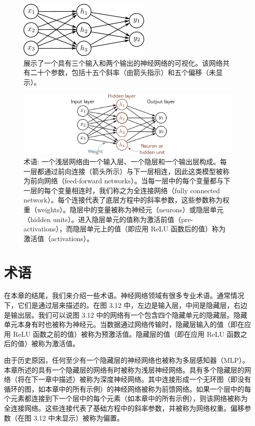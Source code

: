 \begin{figure}[ht!]
	\centering
	\includegraphics[width=0.7\linewidth]{png/chapter3/ShallowNetThreeInputsTwoOutputs.png}
\caption{展示了一个具有三个输入和两个输出的神经网络的可视化。该网络共有二十个参数，包括十五个斜率（由箭头指示）和五个偏移（未显示）。}
\end{figure}

\begin{figure}[ht!]
	\centering
	\includegraphics[width=0.7\linewidth]{png/chapter3/ShallowTerminology.png}
\caption{术语: 一个浅层网络由一个输入层、一个隐层和一个输出层构成。每一层都通过前向连接（箭头所示）与下一层相连，因此这类模型被称为前向网络（feed-forward networks）。当每一层中的每个变量都与下一层的每个变量相连时，我们称之为全连接网络（fully connected network）。每个连接代表了底层方程中的斜率参数，这些参数称为权重（weights）。隐层中的变量被称为神经元（neurons）或隐层单元（hidden units）。进入隐层单元的值称为激活前值（pre-activations），而隐层单元上的值（即应用 ReLU 函数后的值）称为激活值（activations）。}
\end{figure}

\section{术语}
在本章的结尾，我们来介绍一些术语。神经网络领域有很多专业术语。通常情况下，它们是通过层来描述的。在图 3.12 中，左边是输入层，中间是隐藏层，右边是输出层。我们可以说图 3.12 中的网络有一个包含四个隐藏单元的隐藏层。隐藏单元本身有时也被称为神经元。当数据通过网络传输时，隐藏层输入的值（即在应用 ReLU 函数之前的值）被称为预激活值。隐藏层的值（即在应用 ReLU 函数之后的值）被称为激活值。

由于历史原因，任何至少有一个隐藏层的神经网络也被称为多层感知器（MLP）。本章所述的具有一个隐藏层的网络有时被称为浅层神经网络。具有多个隐藏层的网络（将在下一章中描述）被称为深度神经网络。其中连接形成一个无环图（即没有循环的图，如本章中的所有示例）的神经网络被称为前馈网络。如果一个层中的每个元素都连接到下一个层中的每个元素（如本章中的所有示例），则该网络被称为全连接网络。这些连接代表了基础方程中的斜率参数，并被称为网络权重。偏移参数（在图 3.12 中未显示）被称为偏置。

